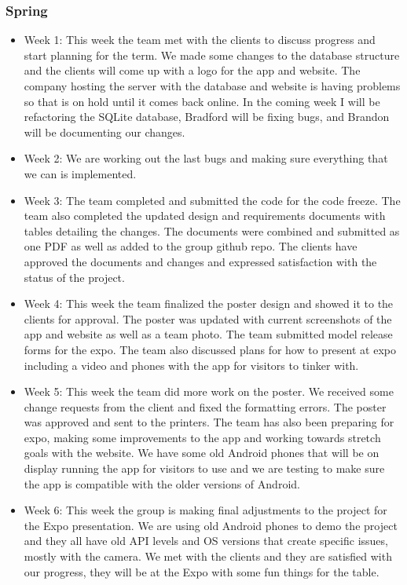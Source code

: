 \documentclass[onecolumn, draftclsnofoot,10pt, compsoc]{IEEEtran}
\begin{document}
 \subsubsection{Spring}
 \begin{itemize}
     \item Week 1: This week the team met with the clients to discuss progress and start planning for the term. We made some changes to the database structure and the clients will come up with a logo for the app and website. The company hosting the server with the database and website is having problems so that is on hold until it comes back online. In the coming week I will be refactoring the SQLite database, Bradford will be fixing bugs, and Brandon will be documenting our changes.
     \item Week 2: We are working out the last bugs and making sure everything that we can is implemented.
     \item Week 3: The team completed and submitted the code for the code freeze. The team also completed the updated design and requirements documents with tables detailing the changes. The documents were combined and submitted as one PDF as well as added to the group github repo. The clients have approved the documents and changes and expressed satisfaction with the status of the project. 
     \item Week 4: This week the team finalized the poster design and showed it to the clients for approval. The poster was updated with current screenshots of the app and website as well as a team photo. The team submitted model release forms for the expo. The team also discussed plans for how to present at expo including a video and phones with the app for visitors to tinker with. 
     \item Week 5: This week the team did more work on the poster. We received some change requests from the client and fixed the formatting errors. The poster was approved and sent to the printers. The team has also been preparing for expo, making some improvements to the app and working towards stretch goals with the website. We have some old Android phones that will be on display running the app for visitors to use and we are testing to make sure the app is compatible with the older versions of Android. 
     \item Week 6: This week the group is making final adjustments to the project for the Expo presentation. We are using old Android phones to demo the project and they all have old API levels and OS versions that create specific issues, mostly with the camera. We met with the clients and they are satisfied with our progress, they will be at the Expo with some fun things for the table. 
 \end{itemize}
 
\end{document}

